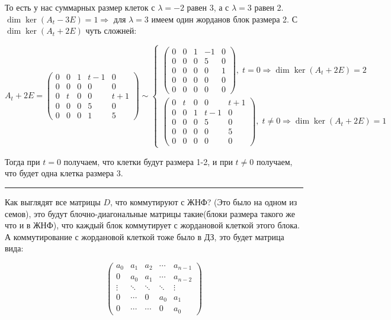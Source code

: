 \documentclass[11pt]{article}
\begin{document}
То есть у нас суммарных размер клеток с $\lambda = -2$ равен 3, а с $\lambda = 3$ равен 2. $\dim \ker(A_t - 3E) = 1 \Rightarrow$ для $\lambda = 3$ имеем один жорданов блок размера 2. С $\dim \ker(A_t + 2E)$ чуть сложней:

$$
A_t + 2E =
\begin{pmatrix}
0 & 0 & 1 & t-1 & 0 \\
0 & 0 & 0 & 0 & 0 \\
0 & t & 0 & 0 & t+1 \\
0 & 0 & 0 & 5 & 0 \\
0 & 0 & 0 & 1 & 5
\end{pmatrix} \sim
\begin{cases}
    \begin{pmatrix}
    0 & 0 & 1 & -1 & 0 \\
    0 & 0 & 0 & 5 & 0 \\
    0 & 0 & 0 & 0 & 1 \\
    0 & 0 & 0 & 0 & 0 \\
    0 & 0 & 0 & 0 & 0
    \end{pmatrix},     \;  t = 0 \Rightarrow \dim \ker (A_t + 2E) = 2 \\[40pt]
    \begin{pmatrix}
    0 & t & 0 & 0 & t+1 \\
    0 & 0 & 1 & t-1 & 0 \\
    0 & 0 & 0 & 5 & 0 \\
    0 & 0 & 0 & 0 & 5 \\
    0 & 0 & 0 & 0 & 0
    \end{pmatrix},     \;  t \neq 0 \Rightarrow \dim \ker(A_t + 2E) = 1
\end{cases}
$$

Тогда при $t = 0$ получаем, что клетки будут размера 1-2, и при $t \neq 0$ получаем, что будет одна клетка размера 3.

\noindent\rule{\textwidth}{0.5pt}
Как выглядят все матрицы $D$, что коммутируют с ЖНФ? (Это было на одном из семов), это будут блочно-диагональные матрицы такие(блоки размера такого же что и в ЖНФ), что каждый блок коммутирует с жордановой клеткой этого блока. А коммутирование с жордановой клеткой тоже было в ДЗ, это будет матрица вида:

$$
\begin{pmatrix}
a_0   & a_1   & a_2   & \cdots & a_{n-1} \\
0     & a_0   & a_1   & \cdots & a_{n-2} \\
\vdots&\ddots&\ddots&\ddots & \vdots  \\
0     & \cdots& 0     & a_0    & a_1     \\
0     & \cdots& \cdots& 0      & a_0
\end{pmatrix}
$$
\end{document}
